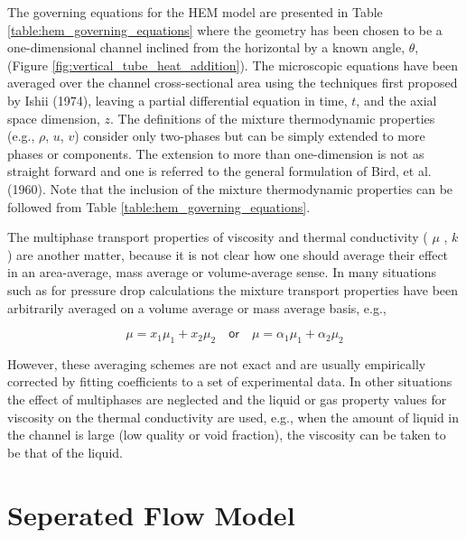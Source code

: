 The governing equations for the HEM model are presented in Table \ref{table:hem_governing_equations} where the geometry has been chosen to be a one-dimensional channel inclined from the horizontal by a known angle, $\theta$, (Figure \ref{fig:vertical_tube_heat_addition}).
The microscopic equations have been averaged over the channel cross-sectional area using the techniques first proposed by Ishii (1974), leaving a partial differential equation in time, $t$, and the axial space dimension, $z$.
The definitions of the mixture thermodynamic properties (e.g., $\rho$, $u$, $v$) consider only two-phases but can be simply extended to more phases or components.
The extension to more than one-dimension is not as straight forward and one is referred to the general formulation of Bird, et al. (1960).
Note that the inclusion of the mixture thermodynamic properties can be followed from Table \ref{table:hem_governing_equations}.

The multiphase transport properties of viscosity and thermal conductivity ( $\mu$ , $k$) are another matter, because it is not clear how one should average their effect in an area-average, mass average or volume-average sense.
In many situations such as for pressure drop calculations the mixture transport properties have been arbitrarily averaged on a volume average or mass average basis, e.g.,

\begin{equation}
\mu = x_1 \mu_1 + x_2 \mu_2\quad \mathsf{or}\quad \mu = \alpha_1 \mu_1 + \alpha_2 \mu_2
\end{equation}

However, these averaging schemes are not exact and are usually empirically corrected by fitting coefficients to a set of experimental data.
In other situations the effect of multiphases are neglected and the liquid or gas property values for viscosity on the thermal conductivity are used, e.g., when the amount of liquid in the channel is large (low quality or void fraction), the viscosity can be taken to be that of the liquid.

\section{Seperated Flow Model}

